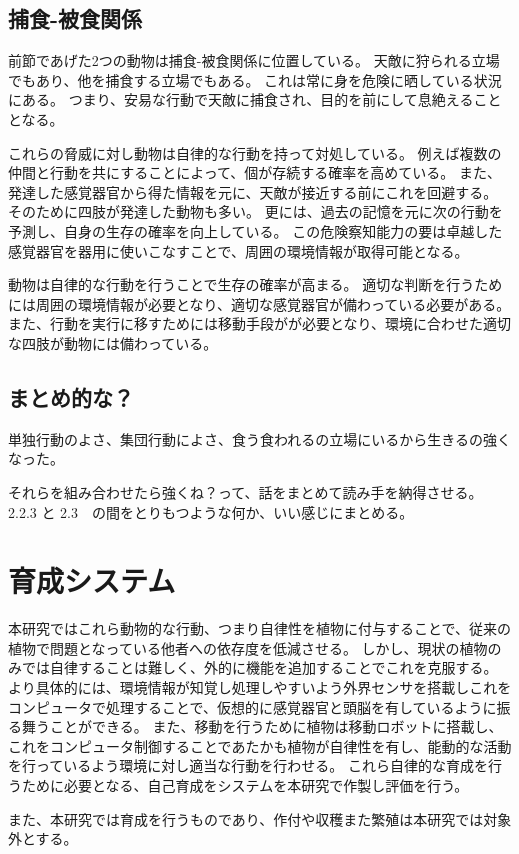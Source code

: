 \subsection{捕食-被食関係}
前節であげた2つの動物は捕食-被食関係に位置している。
天敵に狩られる立場でもあり、他を捕食する立場でもある。
これは常に身を危険に晒している状況にある。
つまり、安易な行動で天敵に捕食され、目的を前にして息絶えることとなる。
\par これらの脅威に対し動物は自律的な行動を持って対処している。
例えば複数の仲間と行動を共にすることによって、個が存続する確率を高めている。
また、発達した感覚器官から得た情報を元に、天敵が接近する前にこれを回避する。
そのために四肢が発達した動物も多い。
更には、過去の記憶を元に次の行動を予測し、自身の生存の確率を向上している。
この危険察知能力の要は卓越した感覚器官を器用に使いこなすことで、周囲の環境情報が取得可能となる。
\par 動物は自律的な行動を行うことで生存の確率が高まる。
適切な判断を行うためには周囲の環境情報が必要となり、適切な感覚器官が備わっている必要がある。
また、行動を実行に移すためには移動手段がが必要となり、環境に合わせた適切な四肢が動物には備わっている。

\subsection{まとめ的な？}
単独行動のよさ、集団行動によさ、食う食われるの立場にいるから生きるの強くなった。
\par それらを組み合わせたら強くね？って、話をまとめて読み手を納得させる。
2.2.3 と 2.3　の間をとりもつような何か、いい感じにまとめる。

\section{育成システム}
本研究ではこれら動物的な行動、つまり自律性を植物に付与することで、従来の植物で問題となっている他者への依存度を低減させる。
しかし、現状の植物のみでは自律することは難しく、外的に機能を追加することでこれを克服する。
より具体的には、環境情報が知覚し処理しやすいよう外界センサを搭載しこれをコンピュータで処理することで、仮想的に感覚器官と頭脳を有しているように振る舞うことができる。
また、移動を行うために植物は移動ロボットに搭載し、これをコンピュータ制御することであたかも植物が自律性を有し、能動的な活動を行っているよう環境に対し適当な行動を行わせる。
これら自律的な育成を行うために必要となる、自己育成をシステムを本研究で作製し評価を行う。
\par また、本研究では育成を行うものであり、作付や収穫また繁殖は本研究では対象外とする。


